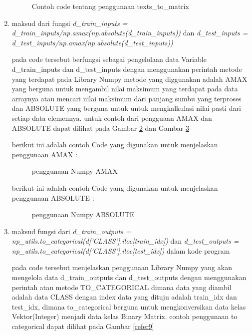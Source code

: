 \begin{enumerate}
\begin{figure}[!htbp]
      \caption{Contoh code tentang penggunaan texts\_to\_matrix}
      \label{refer6}
\end{figure}

\item maksud dari fungsi \emph{d\_train\_inputs = d\_train\_inputs/np.amax(np.absolute(d\_train\_inputs))} dan \emph{d\_test\_inputs = d\_test\_inputs/np.amax(np.absolute(d\_test\_inputs))}

\par pada code tersebut berfungsi sebagai pengelolaan data Variable d\_train\_inputs dan d\_test\_inputs dengan menggunakan perintah metode yang terdapat pada Library Numpy metode yang diggunakan adalah AMAX yang berguna untuk mengambil nilai maksimum yang terdapat pada data arraynya atau mencari nilai maksimum dari panjang sumbu yang terproses dan ABSOLUTE yang berguna untuk untuk mengkalkulasi nilai pasti dari setiap data elemennya. untuk contoh dari pengguaan AMAX dan ABSOLUTE dapat dilihat pada Gambar \ref{refer7} dan Gambar \ref{refer8}

\par berikut ini adalah contoh Code yang digunakan untuk menjelaskan penggunaan AMAX :
\begin{figure}[!htbp]
      \caption{penggunaan Numpy AMAX}
      \label{refer7}
\end{figure}

\par berikut ini adalah contoh Code yang digunakan untuk menjelaskan penggunaan ABSOLUTE :
\begin{figure}[!htbp]
      \caption{penggunaan Numpy ABSOLUTE}
      \label{refer8}
\end{figure}

\item maksud fungsi dari \emph{d\_train\_outputs = np\_utils.to\_categorical(d['CLASS'].iloc[train\_idx])} dan \emph{d\_test\_outputs = np\_utils.to\_categorical(d['CLASS'].iloc[test\_idx])} dalam kode program

\par pada code tersebut menjelaskan penggunaan Library Numpy yang akan mengelola data d\_train\_outputs dan d\_test\_outputs dengan menggunakan perintah atau metode TO\_CATEGORICAL dimana data yang diambil adalah data CLASS dengan index data yang dituju adalah train\_idx dan test\_idx, dimana to\_categorical berguna untuk mengkonversikan data kelas Vektor(Integer) menjadi data kelas Binary Matrix. contoh penggunaan to categorical dapat dilihat pada Gambar \ref{refer9}


\end{enumerate}
